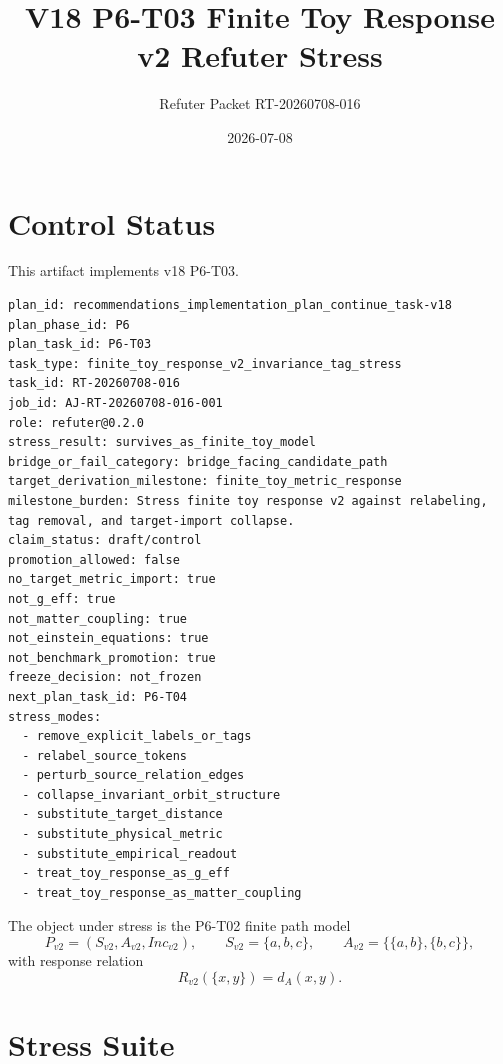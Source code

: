 \documentclass[11pt]{article}
\title{V18 P6-T03 Finite Toy Response v2 Refuter Stress}
\author{Refuter Packet RT-20260708-016}
\date{2026-07-08}
\begin{document}
\maketitle

\section{Control Status}

This artifact implements v18 P6-T03.

\begin{verbatim}
plan_id: recommendations_implementation_plan_continue_task-v18
plan_phase_id: P6
plan_task_id: P6-T03
task_type: finite_toy_response_v2_invariance_tag_stress
task_id: RT-20260708-016
job_id: AJ-RT-20260708-016-001
role: refuter@0.2.0
stress_result: survives_as_finite_toy_model
bridge_or_fail_category: bridge_facing_candidate_path
target_derivation_milestone: finite_toy_metric_response
milestone_burden: Stress finite toy response v2 against relabeling, tag removal, and target-import collapse.
claim_status: draft/control
promotion_allowed: false
no_target_metric_import: true
not_g_eff: true
not_matter_coupling: true
not_einstein_equations: true
not_benchmark_promotion: true
freeze_decision: not_frozen
next_plan_task_id: P6-T04
stress_modes:
  - remove_explicit_labels_or_tags
  - relabel_source_tokens
  - perturb_source_relation_edges
  - collapse_invariant_orbit_structure
  - substitute_target_distance
  - substitute_physical_metric
  - substitute_empirical_readout
  - treat_toy_response_as_g_eff
  - treat_toy_response_as_matter_coupling
\end{verbatim}

The object under stress is the P6-T02 finite path model
\[
  P_{v2}=(S_{v2},A_{v2},Inc_{v2}),\qquad
  S_{v2}=\{a,b,c\},\qquad
  A_{v2}=\{\{a,b\},\{b,c\}\},
\]
with response relation
\[
  R_{v2}(\{x,y\})=d_A(x,y).
\]

\section{Stress Suite}
\end{document}
